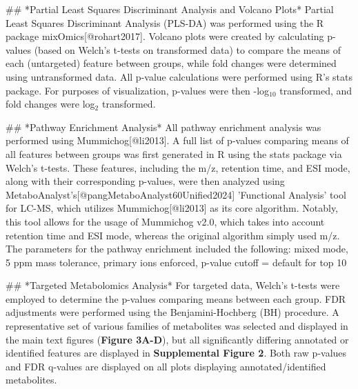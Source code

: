 ## *Partial Least Squares Discriminant Analysis and Volcano Plots*
Partial Least Squares Discriminant Analysis (PLS-DA) was performed using the R package mixOmics[@rohart2017]. Volcano plots were created by calculating p-values (based on Welch's t-tests on transformed data) to compare the means of each (untargeted) feature between groups, while fold changes were determined using untransformed data. All p-value calculations were performed using R's stats package. For purposes of visualization, p-values were then -log$_{10}$ transformed, and fold changes were log$_2$ transformed.

## *Pathway Enrichment Analysis*
All pathway enrichment analysis was performed using Mummichog[@li2013]. A full list of p-values comparing means of all features between groups was first generated in R using the stats package via Welch's t-tests. These features, including the m/z, retention time, and ESI mode, along with their corresponding p-values, were then analyzed using MetaboAnalyst's[@pangMetaboAnalyst60Unified2024] 'Functional Analysis' tool for LC-MS, which utilizes Mummichog[@li2013] as its core algorithm. Notably, this tool allows for the usage of Mummichog v2.0, which takes into account retention time and ESI mode, whereas the original algorithm simply used m/z. The parameters for the pathway enrichment included the following: mixed mode, 5 ppm mass tolerance, primary ions enforced, p-value cutoff = default for top 10%

## *Targeted Metabolomics Analysis*
For targeted data, Welch's t-tests were employed to determine the p-values comparing means between each group. FDR adjustments were performed using the Benjamini-Hochberg (BH) procedure. A representative set of various families of metabolites was selected and displayed in the main text figures (\textbf{Figure 3A-D}), but all significantly differing annotated or identified features are displayed in \textbf{Supplemental Figure 2}. Both raw p-values and FDR q-values are displayed on all plots displaying annotated/identified metabolites.

